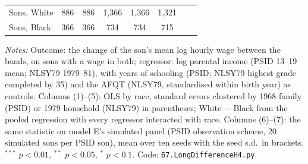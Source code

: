 \begin{table}[!htbp]
{\begin{tabular}{lccccccc}
\quad Sons, White & 886 & 886 & 1,366 & 1,366 & 1,321 & & \\
\quad Sons, Black & 366 & 366 & 734 & 734 & 715 & & \\
\bottomrule
\end{tabular}}
\par\smallskip
\begin{minipage}{\textwidth}\footnotesize \textit{Notes:} Outcome: the change of the son's mean log hourly wage between the bands, on sons with a wage in both; regressor: log parental income (PSID 13--19 mean; NLSY79 1979--81), with years of schooling (PSID; NLSY79 highest grade completed by 35) and the AFQT (NLSY79, standardised within birth year) as controls. Columns (1)--(5): OLS by race, standard errors clustered by 1968 family (PSID) or 1979 household (NLSY79) in parentheses; White $-$ Black from the pooled regression with every regressor interacted with race. Columns (6)--(7): the same statistic on model E's simulated panel (PSID observation scheme, 20 simulated sons per PSID son), mean over ten seeds with the seed s.d.\ in brackets. $^{***}$ $p<0.01$, $^{**}$ $p<0.05$, $^{*}$ $p<0.1$. Code: \texttt{67.LongDifferenceH4.py}.\end{minipage}
\end{table}
